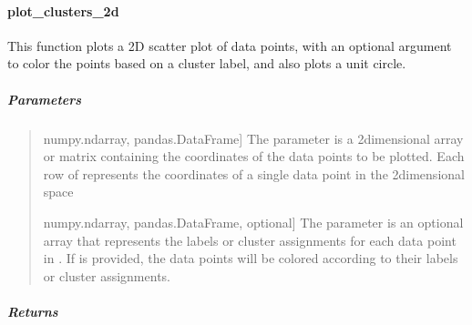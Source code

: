 \documentclass[letterpaper,10pt,english,openany,oneside]{sphinxmanual}
\begin{document}
\sphinxstepscope


\paragraph{plot\_clusters\_2d}
\label{\detokenize{api_reference/generated/QuadratiK.tools.plot_clusters_2d:plot-clusters-2d}}\label{\detokenize{api_reference/generated/QuadratiK.tools.plot_clusters_2d::doc}}

\begin{fulllineitems}
\label{\detokenize{api_reference/generated/QuadratiK.tools.plot_clusters_2d:QuadratiK.tools.plot_clusters_2d}}
\pysigstartsignatures
{}
\pysigstopsignatures
\sphinxAtStartPar
This function plots a 2D scatter plot of data points, 
with an optional argument to color the points based on 
a cluster label, and also plots a unit circle.


\subparagraph{Parameters}
\label{\detokenize{api_reference/generated/QuadratiK.tools.plot_clusters_2d:parameters}}\begin{quote}
\begin{description}
\sphinxlineitem{x}{[}numpy.ndarray, pandas.DataFrame{]}
\sphinxAtStartPar
The parameter  is a 2\sphinxhyphen{}dimensional array or matrix 
containing the coordinates of the data points to be plotted. 
Each row of  represents the coordinates of a single data point 
in the 2\sphinxhyphen{}dimensional space

\sphinxlineitem{y}{[}numpy.ndarray, pandas.DataFrame, optional{]}
\sphinxAtStartPar
The parameter  is an optional array that represents the labels 
or cluster assignments for each data point in . 
If  is provided, the data points will be colored according to their
labels or cluster assignments.

\end{description}
\end{quote}


\subparagraph{Returns}
\label{\detokenize{api_reference/generated/QuadratiK.tools.plot_clusters_2d:returns}}\begin{quote}


\end{quote}
\end{fulllineitems}
\end{document}
